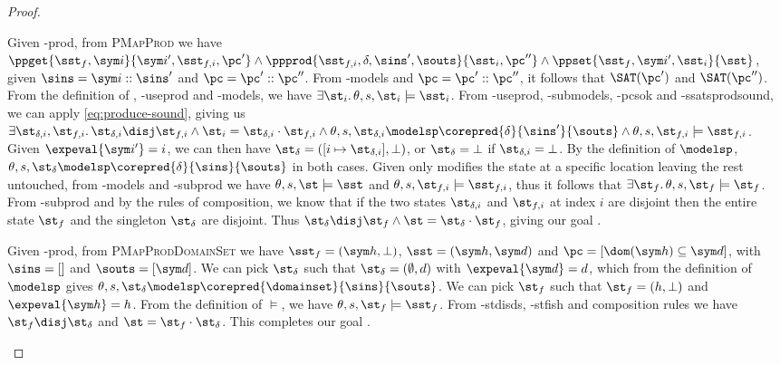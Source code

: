 \begin{proof}
\begin{hypvlist}
 Given \hyp{prod}, from \textsc{PMapProd} we have $\ppget{\sst_f,\sym i}{\sym i',\sst_{f,i},\pc'} \land \ppprod{\sst_{f,i},\delta,\sins',\souts}{\sst_i,\pc''} \land \ppset{\sst_f,\sym i',\sst_i}{\sst}$, given $\sins=\sym i::\sins'$ and $\pc=\pc'::\pc''$.
 From \hyp{models} and $\pc=\pc'::\pc''$, it follows that $\SAT(\pc')$ and $\SAT(\pc'')$.
 From the definition of , \hyp{useprod} and \hyp{models}, we have $\exists \st_i\ldotp \theta,s,\st_i\models \sst_i$.
 From \hyp{useprod}, \hyp{submodels}, \hyp{pcsok} and \hyp{ssatsprodsound}, we can apply \ref{eq:produce-sound}, giving us $\exists \st_{\delta,i}, \st_{f,i}\ldotp \st_{\delta,i}\disj\st_{f,i} \land \st_i=\st_{\delta,i}\cdot\st_{f,i} \land \theta,s,\st_{\delta,i}\modelsp \corepred{\delta}{\sins'}{\souts} \land \theta,s,\st_{f,i}\models\sst_{f,i}$.
 Given $\expeval{\sym i'}=i$, we can then have $\st_\delta=([i\mapsto \st_{\delta,i}], \bot)$, or $\st_\delta=\bot$ if $\st_{\delta,i}=\bot$. By the definition of $\modelsp$, $\theta,s,\st_\delta\modelsp\corepred{\delta}{\sins}{\souts}$ in both cases.
 Given  only modifies the state at a specific location leaving the rest untouched, from \hyp{models} and \hyp{subprod} we have $\theta,s,\st\models\sst$ and $\theta,s,\st_{f,i}\models\sst_{f,i}$, thus it follows that $\exists \st_f\ldotp \theta,s,\st_f\models\st_f$.
 From \hyp{subprod} and by the rules of composition, we know that if the two states $\st_{\delta,i}$ and $\st_{f,i}$ at index $i$ are disjoint then the entire state $\st_f$ and the singleton $\st_\delta$ are disjoint. Thus $\st_\delta\disj\st_f\land\st=\st_\delta\cdot\st_f$, giving our goal .
\end{hypvlist}

\pfcase{$\delta = \domainset$}

\begin{hypvlist}
 Given \hyp{prod}, from \textsc{PMapProdDomainSet} we have $\sst_f=(\sym h,\bot)$, $\sst=(\sym h,\sym d)$ and $\pc=[\dom(\sym h)\subseteq \sym d]$, with $\sins=[]$ and $\souts=[\sym d]$.
 We can pick $\st_\delta$ such that $\st_\delta=(\emptyset,d)$ with $\expeval{\sym d}=d$, which from the definition of $\modelsp$ gives $\theta,s,\st_\delta\modelsp\corepred{\domainset}{\sins}{\souts}$.
 We can pick $\st_f$ such that $\st_f=(h,\bot)$ and $\expeval{\sym h}=h$. From the definition of $\models$, we have $\theta,s,\st_f\models\sst_f$.
 From \hyp{stdisds}, \hyp{stfish} and composition rules we have $\st_f\disj\st_\delta$ and $\st=\st_f\cdot\st_\delta$. This completes our goal .
\end{hypvlist}


\end{proof}
